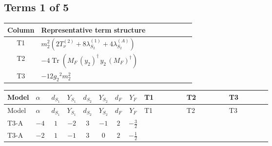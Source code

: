 \documentclass[8pt]{article}
\begin{document}
\begin{landscape}
\subsection*{Terms 1 of 5}
\begin{center}
\begin{tabular}{@{}c >{\raggedright\arraybackslash}p{0.82\linewidth}@{}}
\toprule
Column & Representative term structure \\
\midrule
T1 & \(\displaystyle {m_2^2} (2 T_{\nu}^{(2)}+8 {\lambda_{S_2}^{(1)}}+4 {\lambda_{S_2}^{(A)}})\) \\
\midrule
T2 & \(\displaystyle -4 \operatorname{Tr}\!\left({M_F}\,\left({y_2}\right)^{\dagger}\,{y_2}\,\left({M_F}\right)^{\dagger}\right)\) \\
\midrule
T3 & \(\displaystyle -12 {g_2}^2 {m_2^2}\) \\
\midrule
\bottomrule
\end{tabular}
\end{center}
\smallskip
\tiny
\begin{longtable}{@{}llcccccc >{\raggedright\arraybackslash}p{0.21\linewidth} >{\raggedright\arraybackslash}p{0.21\linewidth} >{\raggedright\arraybackslash}p{0.21\linewidth}@{}}
\toprule
Model & $\alpha$ & $d_{S_1}$ & $Y_{S_1}$ & $d_{S_2}$ & $Y_{S_2}$ & $d_F$ & $Y_F$ & T1 & T2 & T3 \\
\midrule
\endfirsthead
\toprule
Model & $\alpha$ & $d_{S_1}$ & $Y_{S_1}$ & $d_{S_2}$ & $Y_{S_2}$ & $d_F$ & $Y_F$ & T1 & T2 & T3 \\
\midrule
\endhead
T3-A & $-4$ & $1$ & $-2$ & $3$ & $-1$ & $2$ & $-\frac{3}{2}$ & \scriptsize\adjustbox{max width=\linewidth}{$\begin{gathered} {m_2^2} (2 T_{\nu}^{(2)}+8 {\lambda_{S_2}^{(1)}}+4 {\lambda_{S_2}^{(A)}})\end{gathered}$} & \scriptsize\adjustbox{max width=\linewidth}{$\begin{gathered} -4 \operatorname{Tr}\!\left({M_F}\,\left({y_2}\right)^{\dagger}\,{y_2}\,\left({M_F}\right)^{\dagger}\right)\end{gathered}$} & \scriptsize\adjustbox{max width=\linewidth}{$\begin{gathered} -12 {g_2}^2 {m_2^2}\end{gathered}$} \\
\midrule
T3-A & $-2$ & $1$ & $-1$ & $3$ & $0$ & $2$ & $-\frac{1}{2}$ & \scriptsize\adjustbox{max width=\linewidth}{$\begin{gathered} {m_2^2} (2 T_{\nu}^{(2)}+8 {\lambda_{S_2}^{(1)}}+4 {\lambda_{S_2}^{(A)}})\end{gathered}$} & \scriptsize\adjustbox{max width=\linewidth}{$\begin{gathered} -4 \operatorname{Tr}\!\left({M_F}\,\left({y_2}\right)^{\dagger}\,{y_2}\,\left({M_F}\right)^{\dagger}\right)\end{gathered}$} & \scriptsize\adjustbox{max width=\linewidth}{$\begin{gathered} -12 {g_2}^2 {m_2^2}\end{gathered}$} \\

\end{longtable}
\end{landscape}
\end{document}
